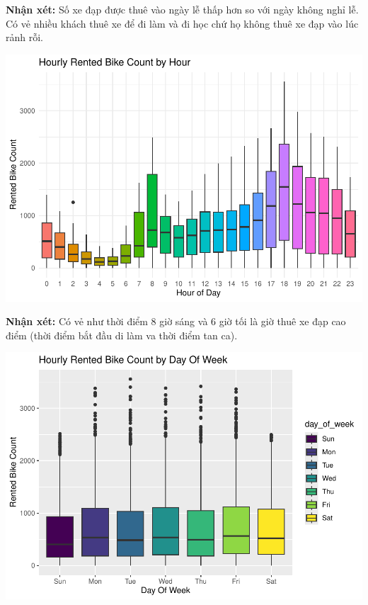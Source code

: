 \documentclass[
  11pt,
  letterpaper,
]{article}
\begin{document}
\textbf{Nhận xét:} Số xe đạp được thuê vào ngày lễ thấp hơn so với ngày không nghỉ lễ. Có vẻ nhiều khách thuê xe để đi làm và đi học chứ họ không thuê xe đạp vào lúc rảnh rỗi.

\begin{center}\includegraphics[width=1.2\linewidth,]{Final_Project_files/figure-latex/unnamed-chunk-5-1} \end{center}

\textbf{Nhận xét:} Có vẻ như thời điểm 8 giờ sáng và 6 giờ tối là giờ thuê xe đạp cao điểm (thời điểm bắt đầu di làm va thời điểm tan ca).

\begin{center}\includegraphics[width=1.2\linewidth,]{Final_Project_files/figure-latex/unnamed-chunk-6-1} \end{center}
\end{document}

